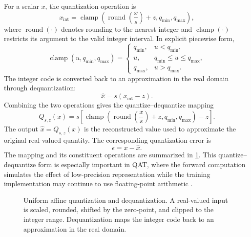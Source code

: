 For a scalar \(x\), the quantization operation is
\begin{equation}
    x_{\mathrm{int}}
    =
    \operatorname{clamp}
    \left(
        \operatorname{round}\left(\frac{x}{s}\right)+z,
        q_{\min},q_{\max}
    \right),
    \label{eq:quant-affine-quantize}
\end{equation}
where \(\operatorname{round}(\cdot)\) denotes rounding to the nearest
integer and \(\operatorname{clamp}(\cdot)\) restricts its argument to the
valid integer interval. In explicit piecewise form,
\begin{equation}
    \operatorname{clamp}(u,q_{\min},q_{\max})
    =
    \begin{cases}
        q_{\min}, & u<q_{\min},\\
        u, & q_{\min}\leq u\leq q_{\max},\\
        q_{\max}, & u>q_{\max}.
    \end{cases}
    \label{eq:quant-clamp}
\end{equation}
The integer code is converted back to an approximation in the real
domain through dequantization:
\begin{equation}
    \widehat{x}=s(x_{\mathrm{int}}-z).
    \label{eq:quant-affine-dequantize}
\end{equation}
Combining the two operations gives the quantize--dequantize mapping
\begin{equation}
    \boxed{
    Q_{s,z}(x)
    =
    s\left[
        \operatorname{clamp}
        \left(
            \operatorname{round}\left(\frac{x}{s}\right)+z,
            q_{\min},q_{\max}
        \right)-z
    \right].
    }
    \label{eq:quant-affine-q}
\end{equation}
The output \(\widehat{x}=Q_{s,z}(x)\) is the reconstructed value used
to approximate the original real-valued quantity. The corresponding
quantization error is
\begin{equation}
    \epsilon=x-\widehat{x}.
    \label{eq:quant-error-definition}
\end{equation}
The mapping and its constituent operations are summarized in
\cref{fig:quant-affine-map}. This quantize--dequantize form is especially
important in QAT, where the forward computation simulates the effect of
low-precision representation while the training implementation may
continue to use floating-point arithmetic
\parencite{song2026targetcentricqat,chen2026llmquantization}.

\begin{figure}[htbp]
    \centering
    
    \caption{Uniform affine quantization and dequantization. A real-valued
    input is scaled, rounded, shifted by the zero-point, and clipped to
    the integer range. Dequantization maps the integer code back to an
    approximation in the real domain.}
    \label{fig:quant-affine-map}
\end{figure}


